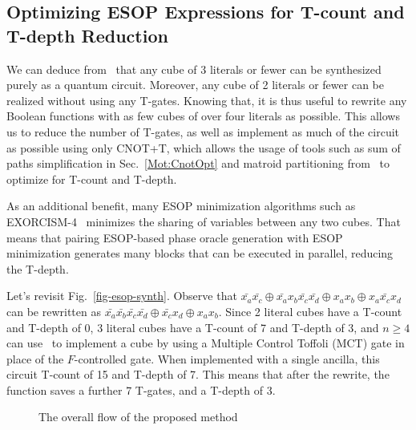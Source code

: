 \subsection{Optimizing ESOP Expressions for T-count and T-depth Reduction}
\label{Mot:Lib}

We can deduce from~ that any cube of 3 literals or fewer can be synthesized
purely as a quantum circuit. Moreover, any cube of 2 literals or fewer can be realized
without using any T-gates. Knowing that, it is thus useful to rewrite any Boolean functions
with as few cubes of over four literals as possible. This allows us to reduce the number
of T-gates, as well as implement as much of the circuit as possible using only CNOT+T, which
allows the usage of tools such as sum of paths simplification in Sec.~\ref{Mot:CnotOpt} and
matroid partitioning from~\cite{bib-amy-matroid} to optimize for T-count and T-depth.

As an additional benefit, many ESOP minimization algorithms such as EXORCISM-4~\cite{bib-exorcism} minimizes the
sharing of variables between any two cubes. That means that pairing ESOP-based phase oracle generation
with ESOP minimization generates many blocks that can be executed in parallel, reducing the T-depth.

\begin{example}
  \label{ex-esop-synth2}
  Let's revisit Fig.~\ref{fig-esop-synth}. Observe that
  $\bar{x_a}\bar{x_c} \oplus \bar{x_a} x_b \bar{x_c}\bar{x_d} \oplus x_a x_b \oplus x_a \bar{x_c} x_d$
  can be rewritten as
  $\bar{x_a} \bar{x_b} \bar{x_c} \bar{x_d} \oplus \bar{x_c} x_d \oplus x_a x_b$.
  Since 2 literal cubes have a T-count and T-depth of 0, 3 literal cubes have a T-count of
  7 and T-depth of 3, and $n \geq 4$ can use~ to implement a cube by
  using a Multiple Control Toffoli (MCT) gate in place of the $F$-controlled gate. When
  implemented with a single ancilla, this circuit T-count of 15 and T-depth of 7. This
  means that after the rewrite, the function saves a further 7 T-gates, and a T-depth of 3.
\end{example}

\begin{figure}[t]
  \centering
  \scalebox{1.0} {
    
  }
  \caption{The overall flow of the proposed method}
  \label{fig-flow}
\end{figure}

